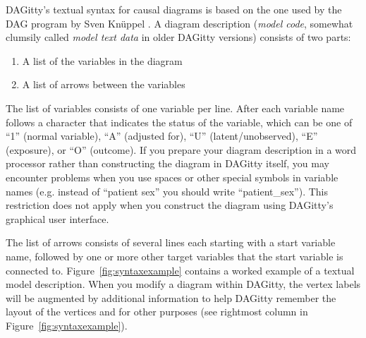 \documentclass[a4paper,10pt]{article}
\newcommand{\pname}{{\sc DAG}itty\xspace}
\begin{document}
\pname's textual syntax for causal diagrams is based on the one used
by the DAG program by Sven Kn\"{u}ppel \cite{KnueppelS2010}. A diagram description 
(\emph{model code}, somewhat clumsily 
called \emph{model text data} in older \pname versions)  
consists of two parts: 

\begin{enumerate}
  \item A list of the variables in the diagram
  \item A list of arrows between the variables
\end{enumerate}

The list of variables consists of one variable per line. 
After each variable name follows 
a character that indicates the status of the variable, which can
be one of ``1'' (normal variable), ``A'' (adjusted for), ``U'' (latent/unobserved),
``E'' (exposure), or ``O'' (outcome). If you prepare your diagram description
in a word processor rather than constructing the diagram in \pname itself,
you may encounter problems when you use spaces or other special symbols
in variable names (e.g. instead of ``patient sex'' you should write 
``patient\_sex''). This restriction does not apply when you construct the
diagram using \pname's graphical user interface.

The list of arrows consists of several lines each starting 
with a start variable name, followed by one or more other target variables 
that the start variable is connected to. Figure~\ref{fig:syntaxexample} 
contains a worked example of a textual model description. When you modify
a diagram within \pname, the vertex labels will be augmented by additional information
to help \pname remember the layout of the vertices and for other purposes (see
rightmost column in Figure~\ref{fig:syntaxexample}).
\end{document}
